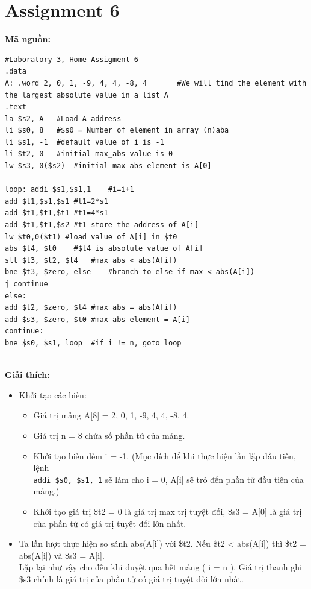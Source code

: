 \documentclass[12pt,a4paper,oneside]{article}
\begin{document}
\section{Assignment 6}
\textbf{Mã nguồn:}
\begin{center}
\begin{lstlisting}
#Laboratory 3, Home Assigment 6
.data 
A: .word 2, 0, 1, -9, 4, 4, -8, 4		#We will tind the element with the largest absolute value in a list A
.text
la $s2, A	#Load A address
li $s0, 8	#$s0 = Number of element in array (n)aba
li $s1, -1	#default value of i is -1
li $t2, 0	#initial max_abs value is 0
lw $s3, 0($s2)	#initial max abs element is A[0]

loop: addi $s1,$s1,1 	#i=i+1
add $t1,$s1,$s1 #t1=2*s1
add $t1,$t1,$t1 #t1=4*s1
add $t1,$t1,$s2 #t1 store the address of A[i]
lw $t0,0($t1) #load value of A[i] in $t0
abs $t4, $t0	#$t4 is absolute value of A[i]
slt $t3, $t2, $t4	#max abs < abs(A[i])
bne $t3, $zero, else	#branch to else if max < abs(A[i])
j continue
else:
add $t2, $zero, $t4	#max abs = abs(A[i])
add $s3, $zero, $t0	#max abs element = A[i]
continue:
bne $s0, $s1, loop	#if i != n, goto loop


\end{lstlisting}
\end{center}
\textbf{Giải thích:}
\begin{itemize}
\item Khởi tạo các biến:
\begin{itemize}
\item Giá trị mảng A[8] = {2, 0, 1, -9, 4, 4, -8, 4}.
\item Giá trị n = 8 chứa số phần tử của mảng.
\item Khởi tạo biến đếm i = -1. (Mục đích để khi thực hiện lần lặp đầu tiên, lệnh \\\lstinline{addi $s0, $s1, 1} sẽ làm cho i = 0, A[i] sẽ trỏ đến phần tử đầu tiên của mảng.)
\item Khởi tạo giá trị \$t2 = 0 là giá trị max trị tuyệt đối, \$s3 = A[0] là giá trị của phần tử có giá trị tuyệt đối lớn nhất. 
\end{itemize} 
\item Ta lần lượt thực hiện so sánh abs(A[i]) với \$t2. Nếu \$t2 < abs(A[i]) thì \$t2 = abs(A[i]) và \$s3 = A[i].\\
Lặp lại như vậy cho đến khi duyệt qua hết mảng ( i = n ). Giá trị thanh ghi \$s3 chính là giá trị của phần tử có giá trị tuyệt đối lớn nhất.
\end{itemize}

    
\end{document}
